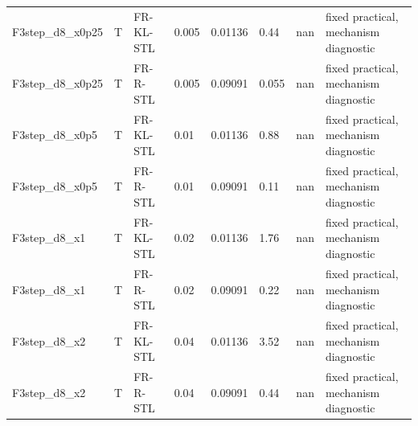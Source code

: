\begin{tabular}{llllllll}
F3step\_d8\_x0p25 & T & FR-KL-STL & 0.005 & 0.01136 & 0.44 & nan & fixed practical, mechanism diagnostic \\
F3step\_d8\_x0p25 & T & FR-R-STL & 0.005 & 0.09091 & 0.055 & nan & fixed practical, mechanism diagnostic \\
F3step\_d8\_x0p5 & T & FR-KL-STL & 0.01 & 0.01136 & 0.88 & nan & fixed practical, mechanism diagnostic \\
F3step\_d8\_x0p5 & T & FR-R-STL & 0.01 & 0.09091 & 0.11 & nan & fixed practical, mechanism diagnostic \\
F3step\_d8\_x1 & T & FR-KL-STL & 0.02 & 0.01136 & 1.76 & nan & fixed practical, mechanism diagnostic \\
F3step\_d8\_x1 & T & FR-R-STL & 0.02 & 0.09091 & 0.22 & nan & fixed practical, mechanism diagnostic \\
F3step\_d8\_x2 & T & FR-KL-STL & 0.04 & 0.01136 & 3.52 & nan & fixed practical, mechanism diagnostic \\
F3step\_d8\_x2 & T & FR-R-STL & 0.04 & 0.09091 & 0.44 & nan & fixed practical, mechanism diagnostic \\
\bottomrule
\end{tabular}
